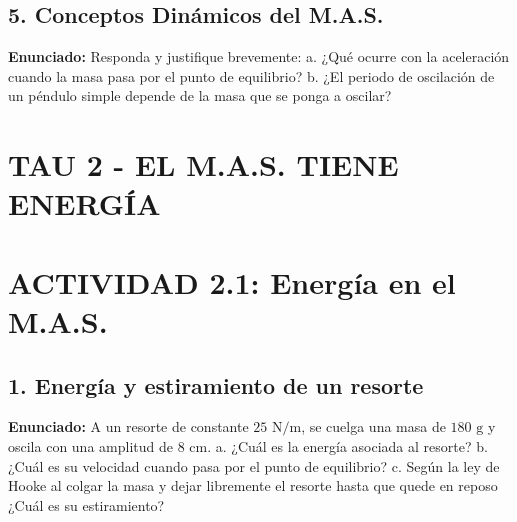 \documentclass[12pt, letterpaper]{article}
\begin{document}
\subsection*{5. Conceptos Dinámicos del M.A.S.}
\noindent \textbf{Enunciado:} Responda y justifique brevemente: a. ¿Qué ocurre con la aceleración cuando la masa pasa por el punto de equilibrio? b. ¿El periodo de oscilación de un péndulo simple depende de la masa que se ponga a oscilar?

\newpage
\section*{TAU 2 - EL M.A.S. TIENE ENERGÍA}

\section*{ACTIVIDAD 2.1: Energía en el M.A.S.}

\subsection*{1. Energía y estiramiento de un resorte}
\noindent \textbf{Enunciado:} A un resorte de constante $25 \text{ N/m}$, se cuelga una masa de $180 \text{ g}$ y oscila con una amplitud de $8 \text{ cm}$. a. ¿Cuál es la energía asociada al resorte? b. ¿Cuál es su velocidad cuando pasa por el punto de equilibrio? c. Según la ley de Hooke al colgar la masa y dejar libremente el resorte hasta que quede en reposo ¿Cuál es su estiramiento?
\end{document}
